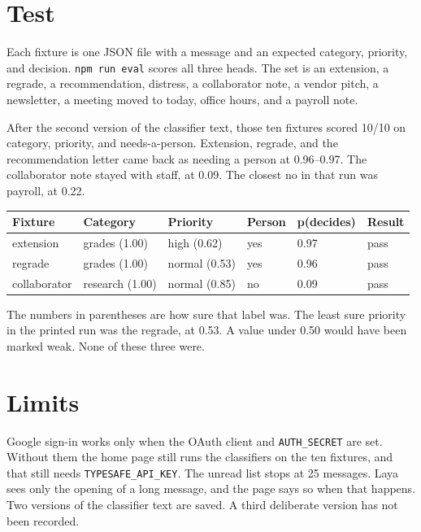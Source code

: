 \documentclass[11pt,a4paper]{article}
\begin{document}
\section{Test}

Each fixture is one JSON file with a message and an expected category, priority, and decision. \texttt{npm run eval} scores all three heads. The set is an extension, a regrade, a recommendation, distress, a collaborator note, a vendor pitch, a newsletter, a meeting moved to today, office hours, and a payroll note.

After the second version of the classifier text, those ten fixtures scored 10/10 on category, priority, and needs-a-person. Extension, regrade, and the recommendation letter came back as needing a person at 0.96--0.97. The collaborator note stayed with staff, at 0.09. The closest no in that run was payroll, at 0.22.

\begin{center}
\small
\begin{tabular}{@{}llllll@{}}
\toprule
\textbf{Fixture} & \textbf{Category} & \textbf{Priority} & \textbf{Person} & \textbf{p(decides)} & \textbf{Result} \\
\midrule
extension & grades (1.00) & high (0.62) & yes & 0.97 & pass \\
regrade & grades (1.00) & normal (0.53) & yes & 0.96 & pass \\
collaborator & research (1.00) & normal (0.85) & no & 0.09 & pass \\
\bottomrule
\end{tabular}
\end{center}

The numbers in parentheses are how sure that label was. The least sure priority in the printed run was the regrade, at 0.53. A value under 0.50 would have been marked weak. None of these three were.

\section{Limits}

Google sign-in works only when the OAuth client and \texttt{AUTH\_SECRET} are set. Without them the home page still runs the classifiers on the ten fixtures, and that still needs \texttt{TYPESAFE\_API\_KEY}. The unread list stops at 25 messages. Laya sees only the opening of a long message, and the page says so when that happens. Two versions of the classifier text are saved. A third deliberate version has not been recorded.
\end{document}
